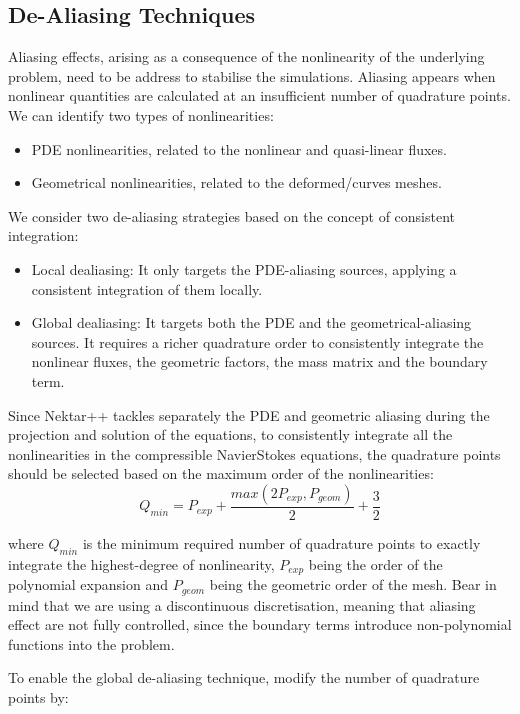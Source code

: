 \subsection{De-Aliasing Techniques}
Aliasing effects, arising as a consequence of the nonlinearity of the
underlying problem, need to be address to stabilise the simulations. Aliasing
appears when nonlinear quantities are calculated at an insufficient number of
quadrature points. We can identify two types of nonlinearities:
\begin{itemize}
\item PDE nonlinearities, related to the nonlinear and quasi-linear fluxes.
\item Geometrical nonlinearities, related to the deformed/curves meshes.
\end{itemize}
We consider two de-aliasing strategies based on the concept of consistent integration:

\begin{itemize}
\item Local dealiasing: It only targets the PDE-aliasing sources, applying a consistent integration of them locally.
\item Global dealiasing: It targets both the PDE and the geometrical-aliasing sources. 
It requires a richer quadrature order to consistently integrate the nonlinear fluxes, 
the geometric factors, the mass matrix and the boundary term.
\end{itemize}

Since Nektar++ tackles separately the PDE and geometric aliasing during the
projection and solution of the equations, to consistently
integrate all the nonlinearities in the compressible
NavierStokes equations, the quadrature points should
be selected based on the maximum order of the nonlinearities:
\begin{equation}
Q_{min}= P_{exp}+\frac{max(2P_{exp},P_{geom})}{2} + \frac{3}{2}
\end{equation}

where $Q_{min}$ is the minimum required number of quadrature
points to exactly integrate the highest-degree of nonlinearity,
$P_{exp}$ being the order of the polynomial expansion and $P_{geom}$
being the geometric order of the mesh. Bear in mind that we are
using a discontinuous discretisation, meaning that aliasing
effect are not fully controlled, since the boundary terms
introduce non-polynomial functions into the problem.

To enable the global de-aliasing technique, modify the number of quadrature
points by:

